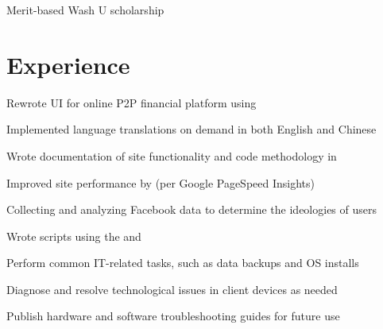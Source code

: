 \documentclass[]{deedy-resume-openfont}
\begin{document}
\begin{minipage}[t]{0.33\textwidth}

\begin{tightemize}
\item Merit-based Wash U scholarship
\end{tightemize}

\sectionsep

%
%

\end{minipage}
\hfill
\begin{minipage}[t]{0.66\textwidth}


\section{Experience}

\vspace{\topsep} %
\begin{tightemize}
\item Rewrote UI for online P2P financial platform using 
\item Implemented language translations on demand in both English and Chinese
\item Wrote documentation of site functionality and code methodology in 
\item Improved site performance by  (per Google PageSpeed Insights)
\end{tightemize}
\sectionsep

\begin{tightemize}
\item Collecting and analyzing Facebook data to determine the ideologies of users
\item Wrote scripts using the  and 
\end{tightemize}
\sectionsep

\begin{tightemize}
\item Perform common IT-related tasks, such as data backups and OS installs
\item Diagnose and resolve technological issues in client devices as needed
\item Publish hardware and software troubleshooting guides for future use
\end{tightemize}
\sectionsep


\end{minipage}
\end{document}
